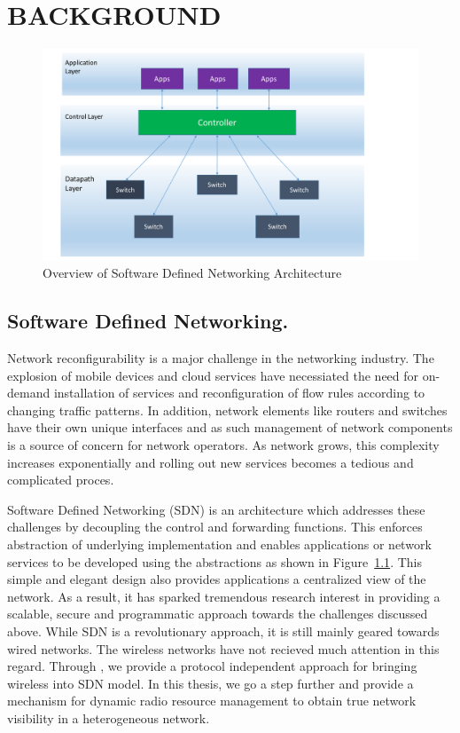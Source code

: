 \chapter{\uppercase {Background}}
\label{sec:background}
\begin{figure}[t]
  \centering
  \includegraphics[width=1\textwidth]{figures/SDN.pdf}
  \caption{Overview of Software Defined Networking Architecture}
  \label{fig:SDN}
\end{figure}

\section{Software Defined Networking.}
Network reconfigurability is a major challenge in the networking industry. The explosion of mobile devices and cloud services have necessiated the need for on-demand installation of services and reconfiguration of flow rules according to changing traffic patterns. In addition, network elements like routers and switches have their own unique interfaces and as such management of network components is a source of concern for network operators. As network grows, this complexity increases exponentially and rolling out new services becomes a tedious and complicated proces.

Software Defined Networking (SDN) is an architecture which addresses these challenges by decoupling the control and forwarding functions. This enforces abstraction of underlying implementation and enables applications or network services to be developed using the abstractions as shown in Figure~\ref{fig:SDN}. This simple and elegant design also provides applications a centralized view of the network. As a result, it has sparked tremendous research interest in providing a scalable, secure and programmatic approach towards the challenges discussed above. While SDN is a revolutionary approach, it is still mainly geared towards wired networks. The wireless networks have not recieved much attention in this regard. Through \aetherflow, we provide a protocol independent approach for bringing wireless into SDN model. In this thesis, we go a step further and provide a mechanism for dynamic radio resource management to obtain true network visibility in a heterogeneous network.     

